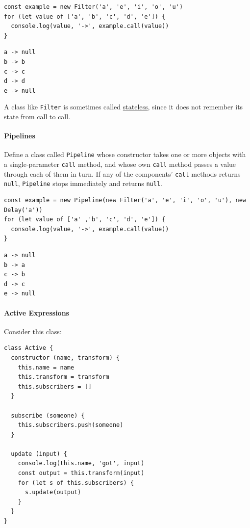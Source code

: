 \begin{verbatim}
const example = new Filter('a', 'e', 'i', 'o', 'u')
for (let value of ['a', 'b', 'c', 'd', 'e']) {
  console.log(value, '->', example.call(value))
}
\end{verbatim}

\begin{verbatim}
a -> null
b -> b
c -> c
d -> d
e -> null
\end{verbatim}

A class like \texttt{Filter} is sometimes called
\protect\hyperlink{g:stateless}{stateless}, since it does not remember
its state from call to call.

\paragraph{Pipelines}\label{pipelines}

Define a class called \texttt{Pipeline} whose constructor takes one or
more objects with a single-parameter \texttt{call} method, and whose own
\texttt{call} method passes a value through each of them in turn. If any
of the components' \texttt{call} methods returns \texttt{null},
\texttt{Pipeline} stops immediately and returns \texttt{null}.

\begin{verbatim}
const example = new Pipeline(new Filter('a', 'e', 'i', 'o', 'u'), new Delay('a'))
for (let value of ['a' ,'b', 'c', 'd', 'e']) {
  console.log(value, '->', example.call(value))
}
\end{verbatim}

\begin{verbatim}
a -> null
b -> a
c -> b
d -> c
e -> null
\end{verbatim}

\paragraph{Active Expressions}\label{active-expressions}

Consider this class:

\begin{verbatim}
class Active {
  constructor (name, transform) {
    this.name = name
    this.transform = transform
    this.subscribers = []
  }

  subscribe (someone) {
    this.subscribers.push(someone)
  }

  update (input) {
    console.log(this.name, 'got', input)
    const output = this.transform(input)
    for (let s of this.subscribers) {
      s.update(output)
    }
  }
}
\end{verbatim}

